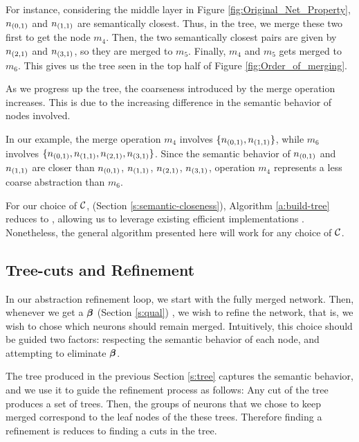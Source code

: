 For instance, considering the middle layer in Figure
\ref{fig:Original_Net_Property}, $n_{(0,1)}$ and $n_{(1,1)}$ are semantically
closest. Thus, in the tree, we merge these two first to get the node $m_4$.
Then, the two semantically closest pairs are given by $n_{(2,1)}$ and
$n_{(3,1)}$, so they are merged to $m_5$. Finally, $m_4$ and $m_5$ gets merged
to $m_6$. This gives us the tree seen in the top half of Figure
\ref{fig:Order_of_merging}.

As we progress up the tree, the coarseness introduced by the 
merge operation increases. 
This is due to the increasing difference in the semantic behavior of nodes
involved. 

In our example, the merge operation
$m_4$ involves $\{n_{(0,1)}, n_{(1,1)}\}$, while $m_6$ involves $\{n_{(0,1)},
n_{(1,1)}, n_{(2,1)}, n_{(3,1)}\}$. Since the semantic behavior of $n_{(0,1)}$
and $n_{(1,1)}$ are closer than $n_{(0,1)}$, $n_{(1,1)}$, $n_{(2,1)}$,
$n_{(3,1)}$, operation $m_4$ represents a less coarse abstraction than $m_6$.

For our choice of $\mathcal{C}$, (Section \ref{s:semantic-closeness}), Algorithm
\ref{a:build-tree} reduces to \hcluster, allowing us to leverage existing
efficient implementations \cite{scipy-hcluster-linkage}. Nonetheless, the
general algorithm presented here will work for any choice of $\mathcal{C}$.

\subsection{Tree-cuts and Refinement}
\label{s:refinement}



In our abstraction refinement loop, we start with the fully merged network.
Then, whenever we get a \gencex $\boldsymbol{\beta}$ (Section \ref{s:qual})
, we wish to refine the network, that is, we wish to chose which
neurons should remain merged. Intuitively, this choice should be guided
two factors: respecting the semantic behavior of each node, and attempting to
eliminate $\boldsymbol{\beta}$.

The tree produced in the previous Section \ref{s:tree} captures the semantic
behavior, and we use it to guide the refinement process as follows:
Any cut of the tree produces a set of trees. Then,  
the groups of neurons that we chose to keep merged correspond to the leaf nodes
of the  these trees. Therefore finding a refinement is reduces to finding a cuts
in the tree.

